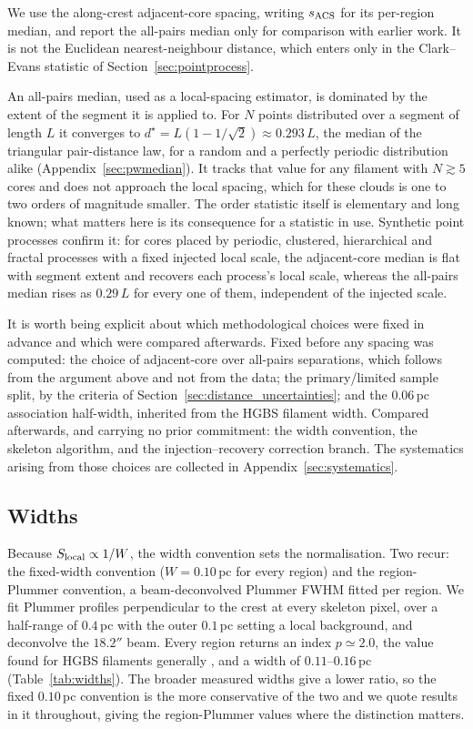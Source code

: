 \documentclass[usenatbib,twoside,twocolumn]{mnras}
\begin{document}
We use the along-crest adjacent-core spacing, writing $s_{\rm ACS}$ for its per-region median, and report the all-pairs median only for comparison with earlier work. It is not the Euclidean nearest-neighbour distance, which enters only in the Clark--Evans statistic of Section~\ref{sec:pointprocess}.

An all-pairs median, used as a local-spacing estimator, is dominated by the extent of the segment it is applied to. For $N$ points distributed over a segment of length $L$ it converges to $d^\star=L(1-1/\sqrt{2})\approx0.293\,L$, the median of the triangular pair-distance law, for a random and a perfectly periodic distribution alike (Appendix~\ref{sec:pwmedian}). It tracks that value for any filament with $N\gtrsim5$ cores and does not approach the local spacing, which for these clouds is one to two orders of magnitude smaller. The order statistic itself is elementary and long known; what matters here is its consequence for a statistic in use. Synthetic point processes confirm it: for cores placed by periodic, clustered, hierarchical and fractal processes with a fixed injected local scale, the adjacent-core median is flat with segment extent and recovers each process's local scale, whereas the all-pairs median rises as $0.29\,L$ for every one of them, independent of the injected scale.

It is worth being explicit about which methodological choices were fixed in advance and which were compared afterwards. Fixed before any spacing was computed: the choice of adjacent-core over all-pairs separations, which follows from the argument above and not from the data; the primary/limited sample split, by the criteria of Section~\ref{sec:distance_uncertainties}; and the $0.06$\,pc association half-width, inherited from the HGBS filament width. Compared afterwards, and carrying no prior commitment: the width convention, the skeleton algorithm, and the injection--recovery correction branch. The systematics arising from those choices are collected in Appendix~\ref{sec:systematics}.

\subsection{Widths}
\label{sec:width}

Because $S_{\rm local}\propto1/W$, the width convention sets the normalisation. Two recur: the fixed-width convention ($W=0.10$\,pc for every region) and the region-Plummer convention, a beam-deconvolved Plummer FWHM fitted per region. We fit Plummer profiles perpendicular to the crest at every skeleton pixel, over a half-range of $0.4$\,pc with the outer $0.1$\,pc setting a local background, and deconvolve the $18.2''$ beam. Every region returns an index $p\simeq2.0$, the value found for HGBS filaments generally \citep{Arzoumanian2019}, and a width of $0.11$--$0.16$\,pc (Table~\ref{tab:widths}). The broader measured widths give a lower ratio, so the fixed $0.10$\,pc convention is the more conservative of the two and we quote results in it throughout, giving the region-Plummer values where the distinction matters.
\end{document}
